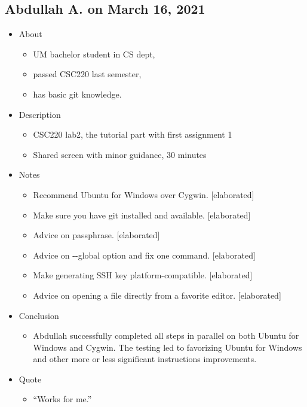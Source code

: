 \subsection{Abdullah A. on March 16, 2021}\label{ssec:abdullah0316}

\begin{itemize}
\item
  {About}
  \begin{itemize}
  \item
    {UM bachelor student in CS dept,}
  \item
    {passed CSC220 last semester,}
  \item
    {has basic git knowledge.}
  \end{itemize}

\item
  {Description}
  \begin{itemize}
  \item
    {CSC220 lab2, the tutorial part with first assignment 1}
  \item
    {Shared screen with minor guidance, 30 minutes}
  \end{itemize}

\item
  {Notes}
  \begin{itemize}
  \item
    {Recommend Ubuntu for Windows over Cygwin. {[}elaborated{]}}
  \item
    {Make sure you have git installed and available. {[}elaborated{]}}
  \item
    {Advice on passphrase. {[}elaborated{]}}
  \item
    {Advice on -\/-global option and fix one command. {[}elaborated{]}}
  \item
    {Make generating SSH key platform-compatible. {[}elaborated{]}}
  \item
    {Advice on opening a file directly from a favorite editor. {[}elaborated{]}}
  \end{itemize}

\item
  {Conclusion}
  \begin{itemize}
  \item
    {Abdullah successfully completed all steps in parallel on both Ubuntu for Windows and Cygwin. The testing led to favorizing Ubuntu for Windows and other more or less significant instructions improvements.}
  \end{itemize}

\item
  {Quote}
  \begin{itemize}
  \item
    {``Works for me.''}
  \end{itemize}
\end{itemize}

